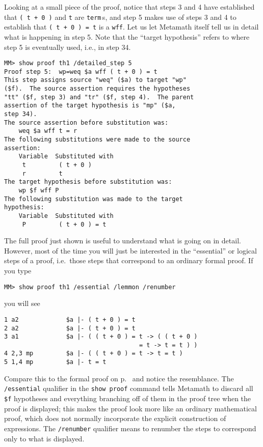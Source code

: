 Looking at a small piece of the proof, notice that steps 3 and 4 have
established that
\texttt{( t + 0 )} and \texttt{t} are \texttt{term}\,s, and step 5 makes use of steps 3 and
4 to establish that \texttt{( t + 0 ) = t} is a \texttt{wff}.  Let us let Metamath
itself tell us in detail what is happening in step 5.  Note that the
``target hypothesis'' refers to where step 5 is eventually used, i.e., in step
34.
\begin{verbatim}
MM> show proof th1 /detailed_step 5
Proof step 5:  wp=weq $a wff ( t + 0 ) = t
This step assigns source "weq" ($a) to target "wp"
($f).  The source assertion requires the hypotheses
"tt" ($f, step 3) and "tr" ($f, step 4).  The parent
assertion of the target hypothesis is "mp" ($a,
step 34).
The source assertion before substitution was:
    weq $a wff t = r
The following substitutions were made to the source
assertion:
    Variable  Substituted with
     t         ( t + 0 )
     r         t
The target hypothesis before substitution was:
    wp $f wff P
The following substitution was made to the target
hypothesis:
    Variable  Substituted with
     P         ( t + 0 ) = t
\end{verbatim}

The full proof just shown is useful to understand what is going on in detail.
However, most of the time you will just be interested in
the ``essential'' or logical steps of a proof, i.e.\ those steps
that correspond to an
ordinary formal proof.  If you type
\begin{verbatim}
MM> show proof th1 /essential /lemmon /renumber
\end{verbatim}
you will see\label{demoproof}
\begin{verbatim}
1 a2             $a |- ( t + 0 ) = t
2 a2             $a |- ( t + 0 ) = t
3 a1             $a |- ( ( t + 0 ) = t -> ( ( t + 0 )
                                     = t -> t = t ) )
4 2,3 mp         $a |- ( ( t + 0 ) = t -> t = t )
5 1,4 mp         $a |- t = t
\end{verbatim}
Compare this to the formal proof on p.~\pageref{zeroproof} and
notice the resemblance.  The \texttt{/essential} qualifier in the \texttt{show
proof} command tells Metamath to discard all \texttt{\$f} hypotheses and everything branching off of them in the proof tree
when the proof is displayed; this makes the proof look more like an ordinary
mathematical proof, which does not normally incorporate the explicit
construction of expressions.  The \texttt{/renumber} qualifier means to renumber
the steps to correspond only to what is displayed.

